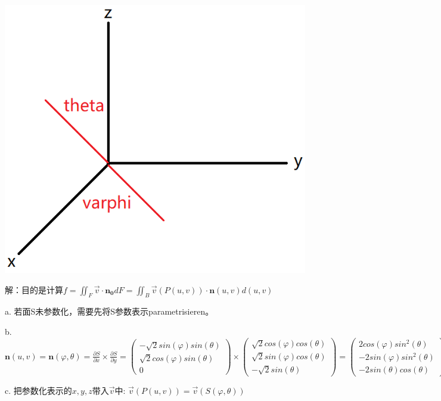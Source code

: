 \documentclass[fleqn]{article}
\begin{document}
\begin{center}
    \includegraphics[scale=0.2]{bild1.png}
\end{center}

解：目的是计算$f=\iint_F\vec{v}\cdot \pmb{n_0}dF=\iint_B\vec{v}(P(u,v))\cdot \pmb{n}(u,v)d(u,v)$

a. 若面S未参数化，需要先将S参数表示parametrisieren。

b. $\pmb{n}(u,v)=\pmb{n}(\varphi,\theta)=\frac{\partial S}{\partial x}\times\frac{\partial S}{\partial y}=\begin{pmatrix}
    -\sqrt{2}sin(\varphi)sin(\theta)\\\sqrt{2}cos(\varphi)sin(\theta)\\0
\end{pmatrix}\times\begin{pmatrix}
    \sqrt{2}cos(\varphi)cos(\theta)\\\sqrt{2}sin(\varphi)cos(\theta)\\-\sqrt{2}sin(\theta)
\end{pmatrix}=\begin{pmatrix}
    2cos(\varphi)sin^2(\theta)\\-2sin(\varphi)sin^2(\theta)\\-2sin(\theta)cos(\theta)
\end{pmatrix}$

c. 把参数化表示的$x,y,z$带入$\vec{v}$中: $\vec{v}(P(u,v))=\vec{v}(S(\varphi,\theta))$
\end{document}
